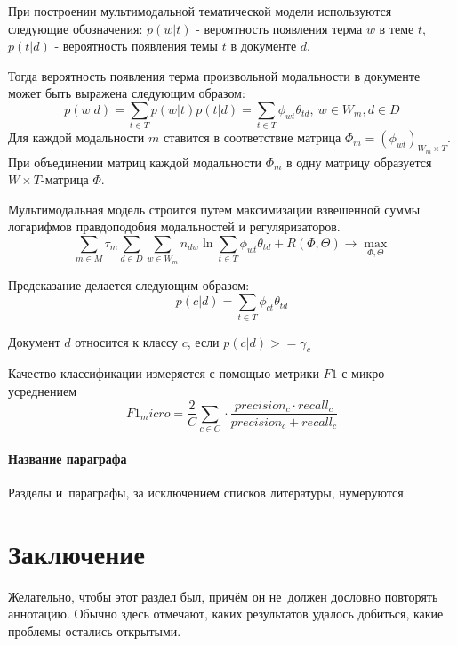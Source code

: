 \documentclass[12pt, twoside]{article}
\begin{document}
При построении мультимодальной тематической модели используются следующие обозначения: $p(w|t)$ - вероятность появления терма $w$ в теме $t$, $p(t|d)$ - вероятность появления темы $t$ в документе $d$. 

Тогда вероятность появления терма произвольной модальности в документе может быть выражена следующим образом:
\begin{equation}
	p(w|d) = \sum\limits_{t \in T}p(w|t)p(t|d) = \sum\limits_{t \in T}\phi_{wt}\theta_{td}, \ w \in W_m, d \in D
\end{equation}
Для каждой модальности $m$ ставится в соответствие матрица $\Phi_m = (\phi_{wt})_{W_m \times T}$. При объединении матриц каждой модальности $\Phi_m$ в одну матрицу образуется $W \times T$-матрица $\Phi$.

Мультимодальная модель строится путем максимизации взвешенной суммы логарифмов правдоподобия модальностей и регуляризаторов.
\begin{equation}
    \sum\limits_{m \in M} \tau_m \sum\limits_{d \in D} \sum\limits_{w \in W_m} n_{dw} \ln \sum\limits_{t \in T} \phi_{wt}\theta_{td} + R(\Phi, \Theta) \rightarrow  \max_{\Phi, \Theta} %
\end{equation}

Предсказание делается следующим образом:
\begin{equation}
    p(c|d) = \sum_{t \in T} \phi_{ct}\theta_{td} %
\end{equation}

Документ $d$ относится к классу $c$, если $p(c|d) >= \gamma_c$


Качество классификации измеряется с помощью метрики $F1$ с микро усреднением
\begin{equation}
    F1_micro = \frac{2}{C} \sum\limits_{c \in C} \cdot \frac{precision_c \cdot recall_c}{precision_c + recall_c}
\end{equation}



 
\paragraph{Название параграфа}
Разделы и~параграфы, за исключением списков литературы, нумеруются.

\section{Заключение}
Желательно, чтобы этот раздел был, причём он не~должен дословно повторять аннотацию.
Обычно здесь отмечают, каких результатов удалось добиться, какие проблемы остались открытыми.



\end{document}

